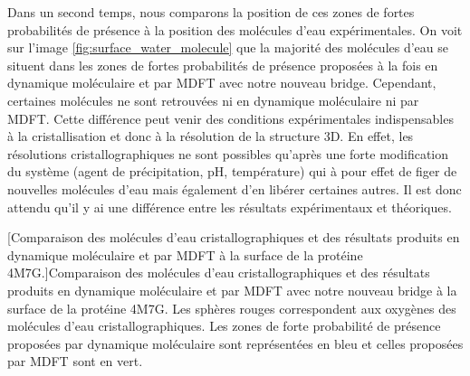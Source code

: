 Dans un second temps, nous comparons la position de ces zones de fortes probabilités de présence à la position des molécules d'eau expérimentales. On voit sur l'image \ref{fig:surface_water_molecule} que la majorité des molécules d'eau se situent dans les zones de fortes probabilités de présence proposées à la fois en dynamique moléculaire et par MDFT avec notre nouveau bridge. Cependant, certaines molécules ne sont retrouvées ni en dynamique moléculaire ni par MDFT. Cette différence peut venir des conditions expérimentales indispensables à la cristallisation et donc à la résolution de la structure 3D. En effet, les résolutions cristallographiques ne sont possibles qu'après une forte modification du système (agent de précipitation, pH, température) qui à pour effet de figer de nouvelles molécules d'eau mais également d'en libérer certaines autres. Il est donc attendu qu'il y ai une différence entre les résultats expérimentaux et théoriques.




\begin{center}
    \captionsetup{type=figure}
	[Comparaison des molécules d'eau cristallographiques et des résultats produits en dynamique moléculaire et par MDFT à la surface de la protéine 4M7G.]{Comparaison des molécules d'eau cristallographiques et des résultats produits en dynamique moléculaire et par MDFT avec notre nouveau bridge à la surface de la protéine 4M7G. Les sphères rouges correspondent aux oxygènes des molécules d'eau cristallographiques. Les zones de forte probabilité de présence proposées par dynamique moléculaire sont représentées en bleu et celles proposées par MDFT sont en vert.}
      \label{fig:surface_water_molecule}
\end{center}



